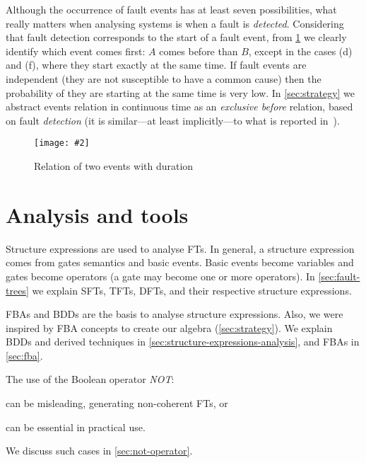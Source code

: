 \documentclass[12pt,openright,twoside,a4paper,oldfontcommands,english,brazil,draft]{abntex2}
\theoremstyle{theo}
\newcommand{\includegraphicsaspectratio}[2][1]{%
  \texttt{[image: \#2]}%
}
\begin{document}
Although the occurrence of fault events has at least seven possibilities, what really matters when analysing systems is when a fault is \emph{detected}.
Considering that fault detection corresponds to the start of a fault event, from \cref{fig:time-relations} we clearly identify which event comes first: $A$ comes before than $B$, except in the cases (d) and (f), where they start exactly at the same time.
If fault events are independent (they are not susceptible to have a common cause) then the probability of they are starting at the same time is very low.
In \cref{sec:strategy} we abstract events relation in continuous time as an \emph{exclusive before} relation, based on fault \emph{detection} (it is similar---at least implicitly---to what is reported in~\cite{WP2009,MRL2011}).


\begin{figure}[t]
  \centering
  \includegraphicsaspectratio[0.5]{time-relations}
  \caption{Relation of two events with duration}
  \label{fig:time-relations}
\end{figure}

\chapter{Analysis and tools}
\label{chap:analysis}

Structure expressions are used to analyse \aclp{FT}.
In general, a structure expression comes from gates semantics and basic events.
Basic events become variables and gates become operators (a gate may become one or more operators).
In \cref{sec:fault-trees} we explain \acp{SFT}, \acp{TFT}, \acp{DFT}, and their respective structure expressions.

\Acp{FBA} and \acp{BDD} are the basis to analyse structure expressions.
Also, we were inspired by \ac{FBA} concepts to create our \acl{algebra} (\cref{sec:strategy}).
We explain \acp{BDD} and derived techniques in \cref{sec:structure-expressions-analysis}, and \acp{FBA} in \cref{sec:fba}.

The use of the Boolean operator \emph{NOT}:
\begin{alineasinline}
  \item can be misleading, generating non-coherent \aclp{FT}, or
  \item can be essential in practical use.
\end{alineasinline}
We discuss such cases in \cref{sec:not-operator}.
\end{document}
